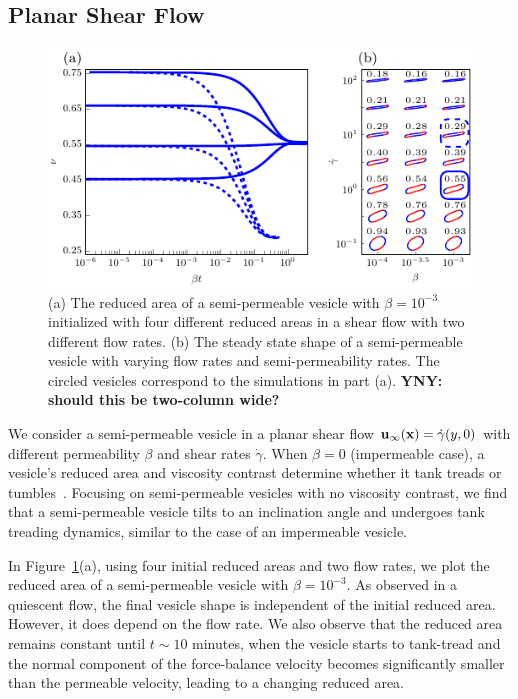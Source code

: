 \documentclass[9pt,twocolumn,twoside,lineno]{pnas-new}
\newif\ifTikz
\begin{document}
\subsection*{Planar Shear Flow}
\begin{figure}[htp]
  \centering
  \ifTikz
  
  \else
  \includegraphics{figures/shearComposite.pdf}
  \fi
  \caption{\label{fig:shearComposite} (a) The reduced area of a
  semi-permeable vesicle with $\beta = 10^{-3}$ initialized with four
  different reduced areas in a shear flow with two different flow rates.
  (b) The steady state shape of a semi-permeable vesicle with varying
  flow rates and semi-permeability rates. The circled vesicles
  correspond to the simulations in part (a). {\bf YNY: should this be two-column wide?}}
\end{figure}

We consider a semi-permeable vesicle in a planar shear flow
$\mathbf{u}_{\infty}(\mathbf{x}) = \dot{\gamma} (y,0)$ with different permeability  $\beta$ and shear rates $\dot{\gamma}$. 
When $\beta=0$ (impermeable case), a vesicle's reduced area
and viscosity contrast determine whether it tank treads or
tumbles~\cite{fin-lam-sei-gom2008, kra-win-sei-lip1996}. 
Focusing on semi-permeable vesicles with no viscosity contrast, 
we find that a semi-permeable vesicle tilts to an
inclination angle and undergoes tank treading dynamics, similar to the case of  an impermeable vesicle.

In Figure~\ref{fig:shearComposite}(a), using four initial reduced areas
and two flow rates, we plot the reduced area of a semi-permeable vesicle
with $\beta = 10^{-3}$. As observed in a quiescent flow, the final
vesicle shape is independent of the initial reduced area. However, it
does depend on the flow rate.  We also observe that the reduced area remains constant until $t\sim 10$ minutes, when
the vesicle starts to tank-tread and the normal component of the force-balance velocity becomes significantly smaller than the permeable velocity, leading to a changing reduced area.
\end{document}
